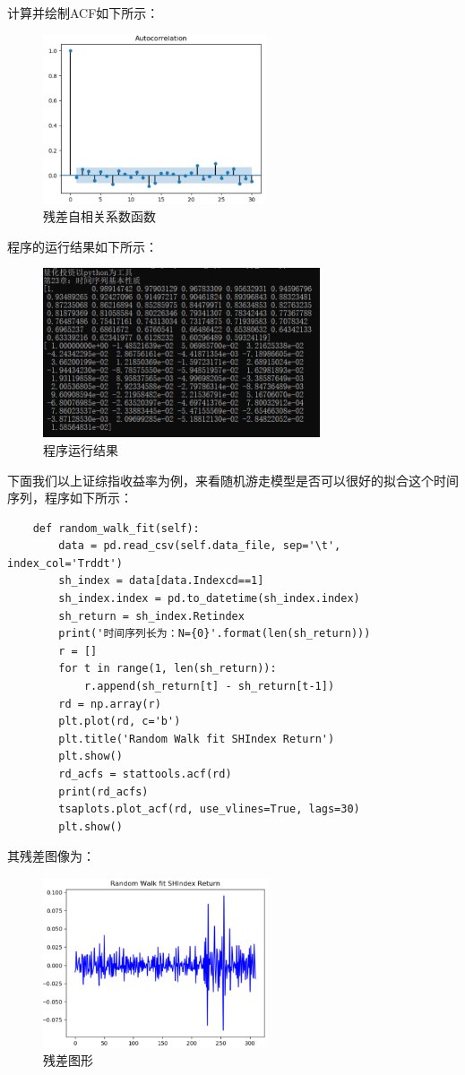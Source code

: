\documentclass{article}
\begin{document}
计算并绘制ACF如下所示：
\begin{figure}[H]
	\caption{残差自相关系数函数}
	\label{f000008}
	\centering
	\includegraphics[height=5cm]{images/f000008}
\end{figure}
程序的运行结果如下所示：
\begin{figure}[H]
	\caption{程序运行结果}
	\label{f000009}
	\centering
	\includegraphics[height=5cm]{images/f000009}
\end{figure}
下面我们以上证综指收益率为例，来看随机游走模型是否可以很好的拟合这个时间序列，程序如下所示：
\begin{lstlisting}
    def random_walk_fit(self):
        data = pd.read_csv(self.data_file, sep='\t', index_col='Trddt')
        sh_index = data[data.Indexcd==1]
        sh_index.index = pd.to_datetime(sh_index.index)
        sh_return = sh_index.Retindex
        print('时间序列长为：N={0}'.format(len(sh_return)))
        r = []
        for t in range(1, len(sh_return)):
            r.append(sh_return[t] - sh_return[t-1])
        rd = np.array(r)
        plt.plot(rd, c='b')
        plt.title('Random Walk fit SHIndex Return')
        plt.show()
        rd_acfs = stattools.acf(rd)
        print(rd_acfs)
        tsaplots.plot_acf(rd, use_vlines=True, lags=30)
        plt.show()
\end{lstlisting}
其残差图像为：
\begin{figure}[H]
	\caption{残差图形}
	\label{f000010}
	\centering
	\includegraphics[height=5cm]{images/f000010}
\end{figure}
\end{document}
